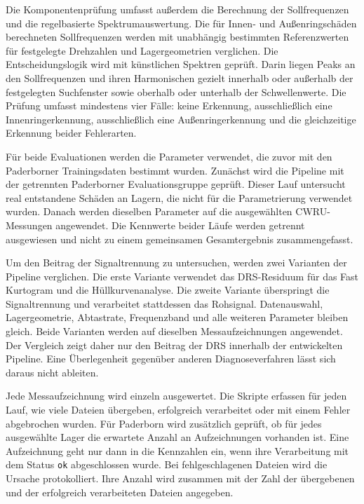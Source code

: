 Die Komponentenprüfung umfasst außerdem die Berechnung der Sollfrequenzen und
die regelbasierte Spektrumauswertung. Die für Innen- und Außenringschäden
berechneten Sollfrequenzen werden mit unabhängig bestimmten Referenzwerten für
festgelegte Drehzahlen und Lagergeometrien verglichen. Die Entscheidungslogik
wird mit künstlichen Spektren geprüft. Darin liegen Peaks an den
Sollfrequenzen und ihren Harmonischen gezielt innerhalb oder außerhalb der
festgelegten Suchfenster sowie oberhalb oder unterhalb der Schwellenwerte. Die
Prüfung umfasst mindestens vier Fälle: keine Erkennung, ausschließlich eine
Innenringerkennung, ausschließlich eine Außenringerkennung und die
gleichzeitige Erkennung beider Fehlerarten.

\label{par:pipelineevaluation}

Für beide Evaluationen werden die Parameter verwendet, die zuvor mit den
Paderborner Trainingsdaten bestimmt wurden. Zunächst wird die Pipeline mit
der getrennten Paderborner Evaluationsgruppe geprüft. Dieser Lauf untersucht
real entstandene Schäden an Lagern, die nicht für die Parametrierung verwendet
wurden. Danach werden dieselben Parameter auf die ausgewählten CWRU-Messungen
angewendet. Die Kennwerte beider Läufe werden getrennt ausgewiesen und nicht
zu einem gemeinsamen Gesamtergebnis zusammengefasst.

Um den Beitrag der Signaltrennung zu untersuchen, werden zwei Varianten der
Pipeline verglichen. Die erste Variante verwendet das \gls{DRS}-Residuum für
das Fast Kurtogram und die Hüllkurvenanalyse. Die zweite Variante überspringt
die Signaltrennung und verarbeitet stattdessen das Rohsignal. Datenauswahl,
Lagergeometrie, Abtastrate, Frequenzband und alle weiteren Parameter bleiben
gleich. Beide Varianten werden auf dieselben Messaufzeichnungen angewendet.
Der Vergleich zeigt daher nur den Beitrag der \gls{DRS} innerhalb der
entwickelten Pipeline. Eine Überlegenheit gegenüber anderen
Diagnoseverfahren lässt sich daraus nicht ableiten.

Jede Messaufzeichnung wird einzeln ausgewertet. Die Skripte erfassen für jeden
Lauf, wie viele Dateien übergeben, erfolgreich verarbeitet oder mit einem
Fehler abgebrochen wurden. Für Paderborn wird zusätzlich geprüft, ob für jedes
ausgewählte Lager die erwartete Anzahl an Aufzeichnungen vorhanden ist. Eine
Aufzeichnung geht nur dann in die Kennzahlen ein, wenn ihre Verarbeitung mit
dem Status \texttt{ok} abgeschlossen wurde. Bei fehlgeschlagenen Dateien wird
die Ursache protokolliert. Ihre Anzahl wird zusammen mit der Zahl der
übergebenen und der erfolgreich verarbeiteten Dateien angegeben.

